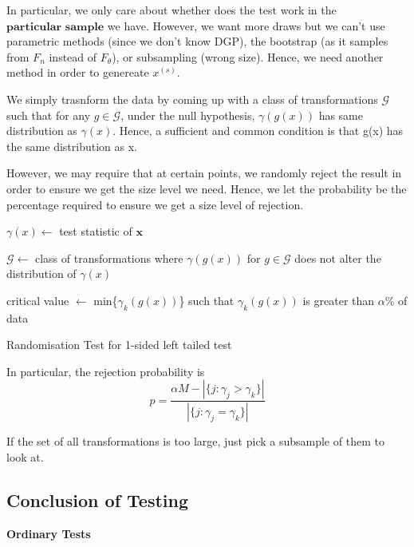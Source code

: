 \documentclass[twoside]{article}
\begin{document}
In particular, we only care about whether does the test work in the $\textbf{particular sample}$ we have. However, we want more draws but we can't use parametric methods (since we don't know DGP), the bootstrap (as it samples from $F_n$ instead of $F_{\theta}$), or subsampling (wrong size). Hence, we need another method in order to genereate $x^{(s)}$.

We simply trasnform the data by coming up with a class of transformations $\mathcal{G}$ such that for any $g \in \mathcal{G}$, under the null hypothesis, $\gamma(g(x))$ has same distribution as $\gamma(x)$. Hence, a sufficient and common condition is that g(x) has the same distribution as x.

However, we may require that at certain points, we randomly reject the result in order to ensure we get the size level we need. Hence, we let the probability be the percentage required to ensure we get a size level of rejection.


\begin{algorithm}
\DontPrintSemicolon
{}

$\gamma(x) \gets$ test statistic of $\textbf{x}$\;

$\mathcal{G} \gets$ class of transformations where $\gamma(g(x)) $ for $g \in \mathcal{G}$ does not alter the distribution of $\gamma(x)$\;


critical value $\gets$ min\{$\gamma_k(g(x))$\} such that $\gamma_k(g(x))$ is greater than $\alpha \%$ of data\;


\caption{{\sc Randomisation Test for 1-sided left tailed test}}
\label{algo:duplicate}
\end{algorithm}

In particular, the rejection probability is
$$
p = \frac{\alpha M - |\{j: \gamma_j > \gamma_k\}|}{|\{j: \gamma_j = \gamma_k\}|}
$$

If the set of all transformations is too large, just pick a subsample of them to look at. 

\subsection{Conclusion of Testing}
\textbf{Ordinary Tests}
\end{document}
